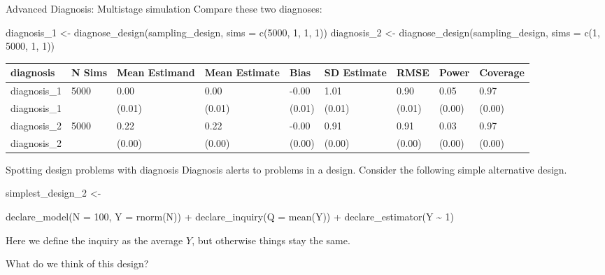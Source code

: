\documentclass[
  11pt,
  ignorenonframetext,
]{beamer}
\newenvironment{Shaded}{\begin{snugshade}}{\end{snugshade}}
\newcommand{\AttributeTok}[1]{\textcolor[rgb]{0.40,0.45,0.13}{#1}}
\newcommand{\DecValTok}[1]{\textcolor[rgb]{0.68,0.00,0.00}{#1}}
\newcommand{\FunctionTok}[1]{\textcolor[rgb]{0.28,0.35,0.67}{#1}}
\newcommand{\NormalTok}[1]{\textcolor[rgb]{0.00,0.23,0.31}{#1}}
\newcommand{\OtherTok}[1]{\textcolor[rgb]{0.00,0.23,0.31}{#1}}
\newcommand{\SpecialCharTok}[1]{\textcolor[rgb]{0.37,0.37,0.37}{#1}}
\begin{document}
\begin{frame}[fragile]{Advanced Diagnosis: Multistage simulation}
\protect\hypertarget{advanced-diagnosis-multistage-simulation-1}{}
Compare these two diagnoses:

\begin{Shaded}
\begin{Highlighting}[]
\NormalTok{diagnosis\_1 }\OtherTok{\textless{}{-}} \FunctionTok{diagnose\_design}\NormalTok{(sampling\_design, }\AttributeTok{sims =} \FunctionTok{c}\NormalTok{(}\DecValTok{5000}\NormalTok{, }\DecValTok{1}\NormalTok{, }\DecValTok{1}\NormalTok{, }\DecValTok{1}\NormalTok{)) }
\NormalTok{diagnosis\_2 }\OtherTok{\textless{}{-}} \FunctionTok{diagnose\_design}\NormalTok{(sampling\_design, }\AttributeTok{sims =} \FunctionTok{c}\NormalTok{(}\DecValTok{1}\NormalTok{, }\DecValTok{5000}\NormalTok{, }\DecValTok{1}\NormalTok{, }\DecValTok{1}\NormalTok{))}
\end{Highlighting}
\end{Shaded}

\begin{tabular}{l|l|l|l|l|l|l|l|l}
\hline
diagnosis & N Sims & Mean Estimand & Mean Estimate & Bias & SD Estimate & RMSE & Power & Coverage\\
\hline
diagnosis\_1 & 5000 & 0.00 & 0.00 & -0.00 & 1.01 & 0.90 & 0.05 & 0.97\\
\hline
diagnosis\_1 &  & (0.01) & (0.01) & (0.01) & (0.01) & (0.01) & (0.00) & (0.00)\\
\hline
diagnosis\_2 & 5000 & 0.22 & 0.22 & -0.00 & 0.91 & 0.91 & 0.03 & 0.97\\
\hline
diagnosis\_2 &  & (0.00) & (0.00) & (0.00) & (0.00) & (0.00) & (0.00) & (0.00)\\
\hline
\end{tabular}
\end{frame}

\begin{frame}[fragile]{Spotting design problems with diagnosis}
\protect\hypertarget{spotting-design-problems-with-diagnosis}{}
Diagnosis alerts to problems in a design. Consider the following simple
alternative design.

\begin{Shaded}
\begin{Highlighting}[]
\NormalTok{simplest\_design\_2 }\OtherTok{\textless{}{-}} 
  
  \FunctionTok{declare\_model}\NormalTok{(}\AttributeTok{N =} \DecValTok{100}\NormalTok{, }\AttributeTok{Y =} \FunctionTok{rnorm}\NormalTok{(N)) }\SpecialCharTok{+}
  \FunctionTok{declare\_inquiry}\NormalTok{(}\AttributeTok{Q =} \FunctionTok{mean}\NormalTok{(Y)) }\SpecialCharTok{+}
  \FunctionTok{declare\_estimator}\NormalTok{(Y }\SpecialCharTok{\textasciitilde{}} \DecValTok{1}\NormalTok{)}
\end{Highlighting}
\end{Shaded}

Here we define the inquiry as the average \(Y\), but otherwise things
stay the same.

What do we think of this design?
\end{frame}
\end{document}
